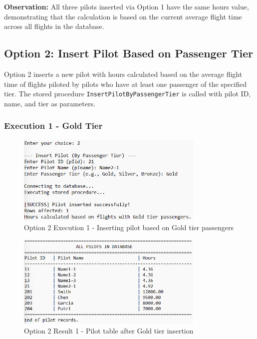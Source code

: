 \documentclass[12pt]{article}
\begin{document}
\textbf{Observation:} All three pilots inserted via Option 1 have the same hours value, demonstrating that the calculation is based on the current average flight time across all flights in the database.

\newpage
\subsection{Option 2: Insert Pilot Based on Passenger Tier}

Option 2 inserts a new pilot with hours calculated based on the average flight time of flights piloted by pilots who have at least one passenger of the specified tier. The stored procedure \texttt{InsertPilotByPassengerTier} is called with pilot ID, name, and tier as parameters.

\subsubsection{Execution 1 - Gold Tier}

\begin{figure}[h]
\centering
\includegraphics[width=0.8\textwidth]{../../../Screenshots/Problem1/Option2/Option2-1.png}
\caption{Option 2 Execution 1 - Inserting pilot based on Gold tier passengers}
\label{fig:option2_exec1}
\end{figure}

\begin{figure}[h]
\centering
\includegraphics[width=0.8\textwidth]{../../../Screenshots/Problem1/Option2/Option2-1_result.png}
\caption{Option 2 Result 1 - Pilot table after Gold tier insertion}
\label{fig:option2_result1}
\end{figure}
\end{document}
